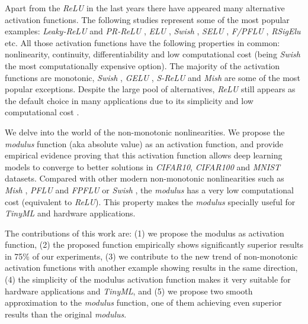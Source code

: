 Apart from the \textit{ReLU} in the last years there have appeared many alternative activation functions. The following studies represent some of the most popular examples: \textit{Leaky-ReLU} and \textit{PR-ReLU} \autocite{xu2015}, \textit{ELU} \autocite{djork2016}, \textit{Swish} \autocite{ramachandran2018}, \textit{SELU} \autocite{klambauer2017}, \textit{F/PFLU} \autocite{zhu2020}, \textit{RSigElu} \autocite{Kilicarslan2021} etc. All those activation functions have the following properties in common: nonlinearity, continuity, differentiability and low computational cost (being \textit{Swish} the most computationally expensive option). The majority of the activation functions are monotonic, \textit{Swish} \autocite{ramachandran2018}, \textit{GELU} \autocite{hendrycks2016},  \textit{S-ReLU} \autocite{Jin2016} and \textit{Mish} \autocite{misra2019mish} are some of the most popular exceptions. Despite the large pool of alternatives, \textit{ReLU} still appears as the default choice in many applications due to its simplicity and low computational cost \autocite{nair2010}.

We delve into the world of the non-monotonic nonlinearities. We propose the \textit{modulus} function (aka absolute value) as an activation function, and provide empirical evidence proving that this activation function allows deep learning models to converge to better solutions in \textit{CIFAR10}, \textit{CIFAR100} and \textit{MNIST} datasets. Compared with other modern non-monotonic nonlinearities such as \textit{Mish} \autocite{misra2019mish}, \textit{PFLU} and \textit{FPFLU} \autocite{zhu2020} or \textit{Swish}  \autocite{ramachandran2018}, the \textit{modulus} has a very low computational cost (equivalent to \textit{ReLU}). This property makes the \textit{modulus} specially useful for \textit{TinyML} \autocite{sanchez2020} and hardware \autocite{Misra2010} applications.

The contributions of this work are: (1) we propose the modulus as activation function, (2) the proposed function empirically shows significantly superior results in 75\% of our experiments, (3) we contribute to the new trend of non-monotonic activation functions with another example showing results in the same direction, (4) the simplicity of the modulus activation function makes it very suitable for hardware applications and \textit{TinyML}, and (5) we propose two smooth approximation to the \textit{modulus} function, one of them achieving even superior results than the original \textit{modulus}.

